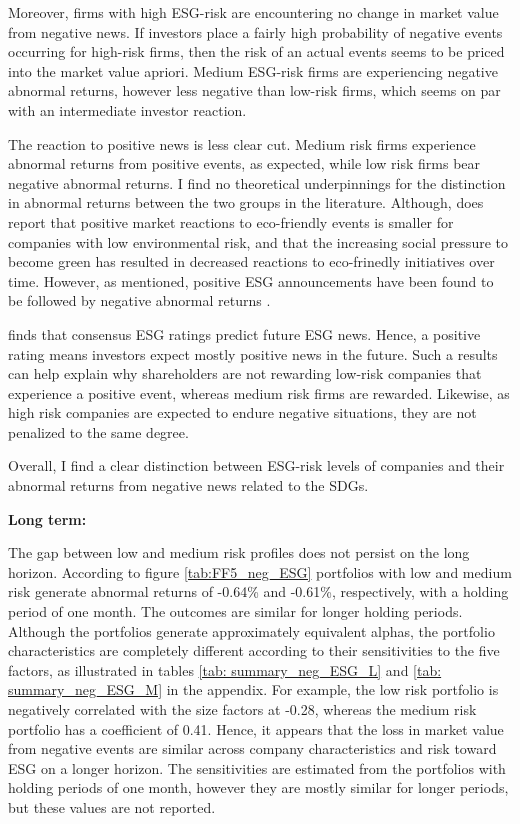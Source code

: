 Moreover, firms with high ESG-risk are encountering no change in market value from negative news. If investors place a fairly high probability of negative events occurring for high-risk firms, then the risk of an actual events seems to be priced into the market value apriori. Medium ESG-risk firms are experiencing negative abnormal returns, however less negative than low-risk firms, which seems on par with an intermediate investor reaction.  

The reaction to positive news is less clear cut. Medium risk firms experience abnormal returns from positive events, as expected, while low risk firms bear negative abnormal returns. I find no theoretical underpinnings for the distinction in abnormal returns between the two groups in the literature. Although, \cite{flammer2013corporate} does report that positive market reactions to eco-friendly events is smaller for companies with low environmental risk, and that the increasing social pressure to become green has resulted in decreased reactions to eco-frinedly initiatives over time. However, as mentioned, positive ESG announcements have been found to be followed by negative abnormal returns \citep{fisher2011voluntary}.  

\cite{serafeim2022stock} finds that consensus ESG ratings predict future ESG news. Hence, a positive rating means investors expect mostly positive news in the future. Such a results can help explain why shareholders are not rewarding low-risk companies that experience a positive event, whereas medium risk firms are rewarded. Likewise, as high risk companies are expected to endure negative situations, they are not penalized to the same degree.  


Overall, I find a clear distinction between ESG-risk levels of companies and their abnormal returns from negative news related to the SDGs. 

\textbf{Long term:}

The gap between low and medium risk profiles does not persist on the long horizon. According to figure \ref{tab:FF5_neg_ESG} portfolios with low and medium risk generate abnormal returns of -0.64\% and -0.61\%, respectively, with a holding period of one month. The outcomes are similar for longer holding periods. 
Although the portfolios generate approximately equivalent alphas, the portfolio characteristics are completely different according to their sensitivities to the five factors, as illustrated in tables \ref{tab: summary_neg_ESG_L} and \ref{tab: summary_neg_ESG_M} in the appendix. For example, the low risk portfolio is negatively correlated with the size factors at -0.28, whereas the medium risk portfolio has a coefficient of 0.41. Hence, it appears that the loss in market value from negative events are similar across company characteristics and risk toward ESG on a longer horizon. The sensitivities are estimated from the portfolios with holding periods of one month, however they are mostly similar for longer periods, but these values are not reported. 


